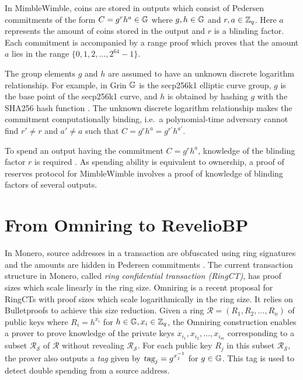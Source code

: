 In MimbleWimble, coins are stored in outputs which consist of Pedersen commitments of the form $C = g^rh^a\in \mathbb{G}$ where $g , h \in \mathbb{G}$ and $r,a \in \mathbb{Z}_q$. Here $a$ represents the amount of coins stored in the output and $r$ is a blinding factor. Each commitment is accompanied by a range proof which proves that the amount $a$ lies in the range $\{0,1,2,\ldots,2^{64}-1\}$.

The group elements $g$ and $h$ are assumed to have an unknown discrete logarithm relationship. For example, in Grin $\mathbb{G}$ is the secp256k1 elliptic curve group, $g$ is the base point of the secp256k1 curve, and $h$ is obtained by hashing $g$ with the SHA256 hash function \cite{RustSecp256k1Constants}. The unknown discrete logarithm relationship makes the commitment computationally binding, i.e.~a polynomial-time adversary cannot find $r' \neq r$ and $a' \neq a$ such that $C = g^rh^a = g^{r'}h^{a'}$.

To spend an output having the commitment $C = g^r h^a$, knowledge of the blinding factor $r$ is required \cite{GrinDocOnGithub}. As spending ability is equivalent to ownership, a proof of reserves protocol for MimbleWimble involves a proof of knowledge of blinding factors of several outputs.


\section{From Omniring to \textnormal{{\selectfont RevelioBP}}}
In Monero, source addresses in a transaction are obfuscated using ring signatures and the amounts are hidden in Pedersen commitments \cite{Noether2016}. 
The current transaction structure in Monero, called \textit{ring confidential transaction (RingCT)}, has proof sizes which scale linearly in the ring size. Omniring \cite{Lai2019} is a recent proposal for RingCTs with proof sizes which scale logarithmically in the ring size. It relies on Bulletproofs \cite{Bunz2018} to achieve this size reduction. Given a ring $\mathcal{R} = (R_1, R_2,\ldots,R_n)$ of public keys where $R_i = h^{x_i}$ for $h \in \mathbb{G}, x_i \in \mathbb{Z}_q$, the Omniring construction enables a prover to prove knowledge of the private keys $x_{i_1}, x_{i_2},\ldots,x_{i_m}$ corresponding to a subset $\mathcal{R}_{\mathcal{S}}$ of $\mathcal{R}$ without revealing $\mathcal{R}_{\mathcal{S}}$. For each public key $R_j$ in this subset $\mathcal{R}_{\mathcal{S}}$, the prover also outputs a \textit{tag} given by $\textsl{tag}_j = g^{x_j^{-1}}$ for $g \in \mathbb{G}$. This tag is used to detect double spending from a source address.

